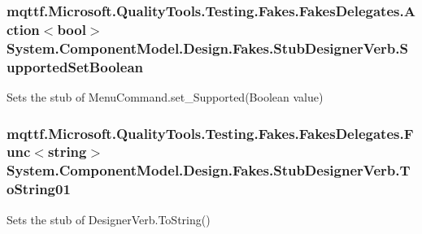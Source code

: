 \hypertarget{class_system_1_1_component_model_1_1_design_1_1_fakes_1_1_stub_designer_verb_a167044114007b762adc67a0148474255}{
\subsubsection[{Supported\-Set\-Boolean}]{\setlength{\rightskip}{0pt plus 5cm}mqttf.\-Microsoft.\-Quality\-Tools.\-Testing.\-Fakes.\-Fakes\-Delegates.\-Action$<$bool$>$ System.\-Component\-Model.\-Design.\-Fakes.\-Stub\-Designer\-Verb.\-Supported\-Set\-Boolean}}\label{class_system_1_1_component_model_1_1_design_1_1_fakes_1_1_stub_designer_verb_a167044114007b762adc67a0148474255}


Sets the stub of Menu\-Command.\-set\-\_\-\-Supported(\-Boolean value)

\hypertarget{class_system_1_1_component_model_1_1_design_1_1_fakes_1_1_stub_designer_verb_a45207a598445b3d570170ffe9a478b44}{
\subsubsection[{To\-String01}]{\setlength{\rightskip}{0pt plus 5cm}mqttf.\-Microsoft.\-Quality\-Tools.\-Testing.\-Fakes.\-Fakes\-Delegates.\-Func$<$string$>$ System.\-Component\-Model.\-Design.\-Fakes.\-Stub\-Designer\-Verb.\-To\-String01}}\label{class_system_1_1_component_model_1_1_design_1_1_fakes_1_1_stub_designer_verb_a45207a598445b3d570170ffe9a478b44}


Sets the stub of Designer\-Verb.\-To\-String()

